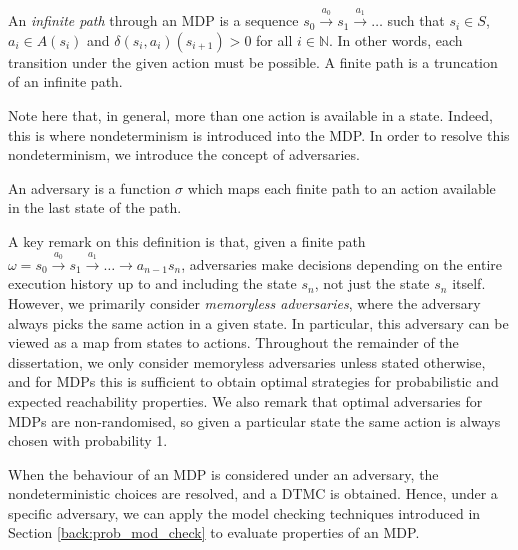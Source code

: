 \begin{definition}
\label{cs1:mdp_paths}

An \emph{infinite path} through an MDP is a sequence $s_0 \xrightarrow{a_0} s_1 \xrightarrow{a_1} \dots$ such that $s_i \in S$, $a_i \in A(s_i)$ and $\delta(s_i,a_i)(s_{i+1}) > 0$ for all $i \in \mathbb{N}$. In other words, each transition under the given action must be possible. A finite path is a truncation of an infinite path.

\end{definition}


Note here that, in general, more than one action is available in a state. Indeed, this is where nondeterminism is introduced into the MDP. In order to resolve this nondeterminism, we introduce the concept of adversaries.

\begin{definition}
\label{cs1:adversaries}

An adversary is a function $\sigma$ which maps each finite path to an action available in the last state of the path.

\end{definition}
 
A key remark on this definition is that, given a finite path $\omega = s_0 \xrightarrow{a_0} s_1 \xrightarrow{a_1} \dots \rightarrow{a_{n-1}} s_n$,  adversaries make decisions depending on the entire execution history up to and including the state $s_n$, not just the state $s_n$ itself. However, we primarily consider \emph{memoryless adversaries}, where the adversary always picks the same action in a given state. In particular, this adversary can be viewed as a map from states to actions. Throughout the remainder of the dissertation, we only consider memoryless adversaries unless stated otherwise, and for MDPs this is sufficient to obtain optimal strategies for probabilistic and expected reachability properties.  We also remark that optimal adversaries for MDPs are non-randomised, so given a particular state the same action is always chosen with probability 1. %

When the behaviour of an MDP is considered under an adversary, the nondeterministic choices are resolved, and a DTMC is obtained. Hence, under a specific adversary, we can apply the model checking techniques introduced in Section \ref{back:prob_mod_check} to evaluate properties of an MDP.

